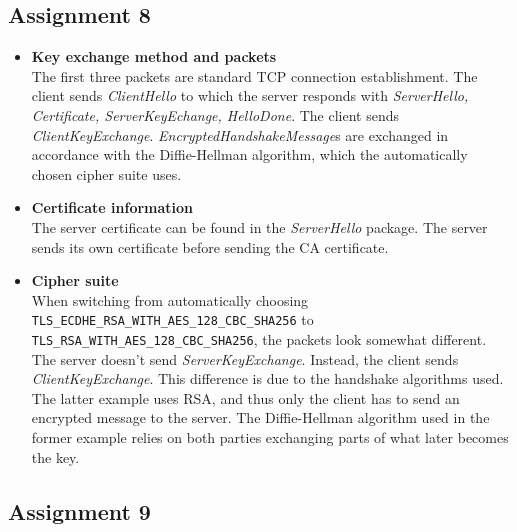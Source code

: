 \documentclass[11pt,a4paper]{article}
\begin{document}
\subsection{Assignment 8} 
\begin{itemize}
\item \textbf{Key exchange method and packets}\\The first three packets are standard TCP connection establishment. The client sends \textit{ClientHello} to which the server responds with \textit{ServerHello, Certificate, ServerKeyEchange, HelloDone}. The client sends \textit{ClientKeyExchange}. \textit{EncryptedHandshakeMessage}s are exchanged in accordance with the Diffie-Hellman algorithm, which the automatically chosen cipher suite uses.
\item \textbf{Certificate information}\\
The server certificate can be found in the \textit{ServerHello} package. The server sends its own certificate before sending the CA certificate.
\item \textbf{Cipher suite}\\
When switching from automatically choosing \texttt{TLS\_ECDHE\_RSA\_WITH\_AES\_128\_CBC\_SHA256} to
\texttt{TLS\_RSA\_WITH\_AES\_128\_CBC\_SHA256}, the packets look somewhat different. The server doesn't send \textit{ServerKeyExchange}. Instead, the client sends \textit{ClientKeyExchange}. This difference is due to the handshake algorithms used. The latter example uses RSA, and thus only the client has to send an encrypted message to the server. The Diffie-Hellman algorithm used in the former example relies on both parties exchanging parts of what later becomes the key.
\end{itemize}

\subsection{Assignment 9}
\end{document}
